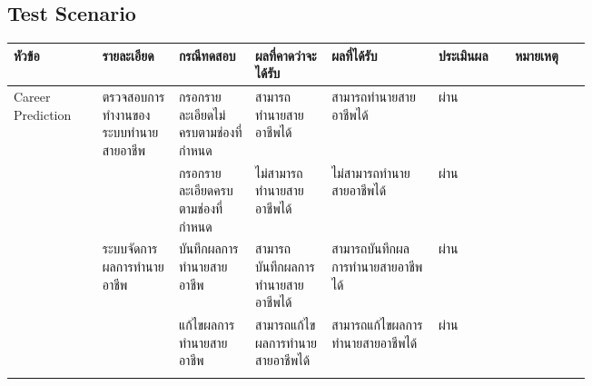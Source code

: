 \subsection{Test Scenario}
\begin{longtable}{|>{\centering}p{0.1\linewidth}|p{0.1\linewidth}|p{0.1\linewidth}|p{0.1\linewidth}|p{0.14\linewidth}|>{\centering}p{0.1\linewidth}|p{0.1\linewidth}|} \hline
    หัวข้อ               & รายละเอียด                        & กรณีทดสอบ                                          & ผลที่คาดว่าจะได้รับ                                                              & ผลที่ได้รับ                                                                            & ประเมินผล & หมายเหตุ                                                \\ \hline
    \endhead
    Career Prediction  & ตรวจสอบการทำงานของระบบทำนายสายอาชีพ & กรอกรายละเอียดไม่ครบตามช่องที่กำหนด                     & สามารถทำนายสายอาชีพได้                                                         & สามารถทำนายสายอาชีพได้                                                                & ผ่าน      &                                                        \\ \cline{3-7}
                       &                                  & กรอกรายละเอียดครบตามช่องที่กำหนด                       & ไม่สามารถทำนายสายอาชีพได้                                                       & ไม่สามารถทำนายสายอาชีพได้                                                              & ผ่าน      &                                                        \\
    \cline{2-7}
                       & ระบบจัดการผลการทำนายอาชีพ           & บันทึกผลการทำนายสายอาชีพ                              & สามารถบันทึกผลการทำนายสายอาชีพได้                                                & สามารถบันทึกผลการทำนายสายอาชีพได้                                                       & ผ่าน      &                                                        \\ \cline{3-7}
                       &                                  & แก้ไขผลการทำนายสายอาชีพ                              & สามารถแก้ไขผลการทำนายสายอาชีพได้                                                & สามารถแก้ไขผลการทำนายสายอาชีพได้                                                       & ผ่าน      &                                                        \\ \cline{3-7}

\end{longtable}
